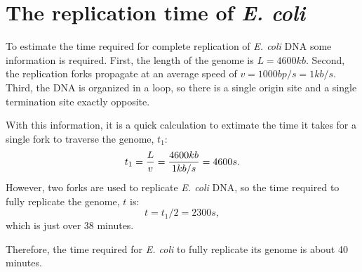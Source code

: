 \chapter{The replication time of \emph{E. coli}}
\label{ap:EColi}

To estimate the time required for complete replication of \emph{E. coli} DNA some information is required.
First, the length of the genome is $L = 4600 kb$.
Second, the replication forks propagate at an average speed of $v = 1000 bp/s = 1 kb/s$.
Third, the DNA is organized in a loop, so there is a single origin site and a single termination site exactly opposite. \cite{EColi}

With this information, it is a quick calculation to extimate the time it takes for a single fork to traverse the genome, $t_1$:
$$
	t_1 = {{L}\over{v}} = {{4600 kb}\over{1 kb/s}} = 4600 s.
$$
However, two forks are used to replicate \emph{E. coli} DNA, so the time required to fully replicate the genome, $t$ is:
$$
	t = t_1/2 = 2300 s,
$$
which is just over 38 minutes.

Therefore, the time required for \emph{E. coli} to fully replicate its genome is about 40 minutes.